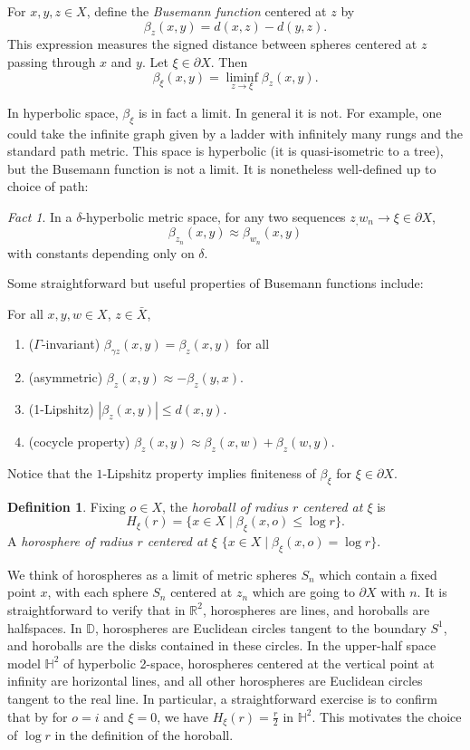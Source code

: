 \documentclass[11pt]{amsart}
\theoremstyle{plain}
\theoremstyle{definition}
\newtheorem{definition}[proposition]{Definition}
\theoremstyle{remark}
\newtheorem{fact}[proposition]{Fact}
\begin{document}
For $x,y,z\in X$, define the {\em Busemann function} centered at $z$ by 
\[
  \beta_z(x,y)=d(x,z)-d(y,z).
\]
This expression measures the signed distance between spheres centered at
$z$ passing through $x$ and $y$. 
Let $\xi\in \partial X$. Then 
\[
  \beta_\xi(x,y)=\liminf_{z\to\xi} \beta_z(x,y). 
\]

In hyperbolic space, $\beta_\xi$ is in fact a limit. In general it is not.
For example, one could take the infinite graph given by a ladder with
infinitely many rungs and the standard path metric. This space is 
hyperbolic (it is quasi-isometric to a tree), but the Busemann function is
not a limit. It is nonetheless well-defined up to choice of path:

\begin{fact}
  In a $\delta$-hyperbolic metric space, for any two sequences
  $z_,w_n\to\xi\in\partial X$, 
  \[
    \beta_{z_n}(x,y)\approx\beta_{w_n}(x,y)
  \]
  with constants depending only on $\delta$. 
\end{fact}

Some straightforward but useful 
properties of Busemann functions include:

For all $x,y,w\in X$, $z\in \bar{X}$, 
\begin{enumerate}
  \item ($\Gamma$-invariant) $\beta_{\gamma z}(x,y)=\beta_z(x,y)$ for all
  \item (asymmetric) $\beta_z (x,y) \approx -\beta_z(y,x)$. 
  \item (1-Lipshitz) $|\beta_z(x,y)|\leq d(x,y)$. 
  \item (cocycle property) $\beta_z(x,y)\approx
    \beta_z(x,w)+\beta_z(w,y)$.
\end{enumerate}

Notice that the $1$-Lipshitz property implies finiteness of $\beta_\xi$ for
$\xi\in\partial X$. 


\begin{definition}
  Fixing $o\in X$, the {\em horoball of radius $r$ centered at $\xi$} is 
  \[
    H_\xi(r)=\{x\in X\mid \beta_\xi(x,o)\leq \log r\}. 
  \]
  A {\em horosphere of radius $r$ centered at $\xi$} 
  $\{x\in X\mid \beta_\xi(x,o)=\log r\}. $
  \label{def:horoball}
\end{definition}


We think of horospheres
as a limit of metric spheres $S_n$
which contain a fixed point $x$, with each sphere $S_n$
centered at 
$z_n$ which are 
going to $\partial X$ with $n$.
It is straightforward to verify that in 
$\mathbb R^2$, horospheres are lines, and horoballs are 
halfspaces. In $\mathbb D$, horospheres are Euclidean circles tangent to
the boundary $S^1$, and horoballs are the disks contained in these circles.
In the upper-half space model $\mathbb H^2$ 
of hyperbolic 2-space, horospheres centered
at the vertical point at infinity are horizontal lines, and all other
horospheres are Euclidean circles tangent to the real line. In particular,
a straightforward exercise is to confirm that by for $o=i$ and  $\xi=0$, we
have $H_\xi(r)=\frac{r}2$ in $\mathbb H^2$. This motivates the choice of
$\log r$ in the definition of the horoball.
\end{document}
